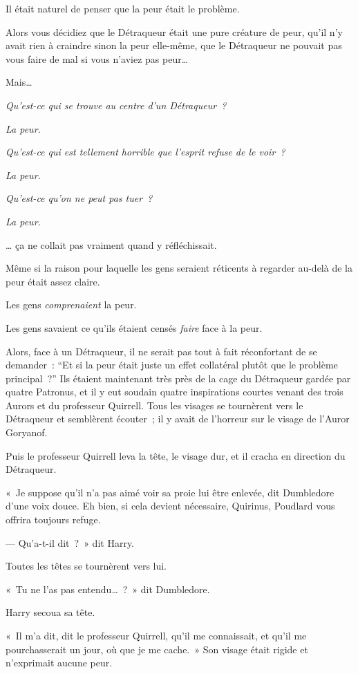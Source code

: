 Il était naturel de penser que la peur était le problème.

Alors vous décidiez que le Détraqueur était une pure créature de peur, qu'il n'y avait rien à craindre sinon la peur elle-même, que le Détraqueur ne pouvait pas vous faire de mal si vous n'aviez pas peur…

Mais…

\emph{Qu'est-ce qui se trouve au centre d'un Détraqueur~?}

\emph{La peur.}

\emph{Qu'est-ce qui est tellement horrible que l'esprit refuse de le voir~?}

\emph{La peur.}

\emph{Qu'est-ce qu'on ne peut pas tuer~?}

\emph{La peur.}

… ça ne collait pas vraiment quand y réfléchissait.

Même si la raison pour laquelle les gens seraient réticents à regarder au-delà de la peur était assez claire.

Les gens \emph{comprenaient} la peur.

Les gens savaient ce qu'ils étaient censés \emph{faire} face à la peur.

Alors, face à un Détraqueur, il ne serait pas tout à fait réconfortant de se demander~: “Et si la peur était juste un effet collatéral plutôt que le problème principal~?”
Ils étaient maintenant très près de la cage du Détraqueur gardée par quatre Patronus, et il y eut soudain quatre inspirations courtes venant des trois Aurors et du professeur Quirrell. Tous les visages se tournèrent vers le Détraqueur et semblèrent écouter~; il y avait de l'horreur sur le visage de l'Auror Goryanof.

Puis le professeur Quirrell leva la tête, le visage dur, et il cracha en direction du Détraqueur.

«~Je suppose qu'il n'a pas aimé voir sa proie lui être enlevée, dit Dumbledore d'une voix douce. Eh bien, si cela devient nécessaire, Quirinus, Poudlard vous offrira toujours refuge.

--- Qu'a-t-il dit~?~» dit Harry.

Toutes les têtes se tournèrent vers lui.

«~Tu ne l'as pas entendu…~?~» dit Dumbledore.

Harry secoua sa tête.

«~Il m'a dit, dit le professeur Quirrell, qu'il me connaissait, et qu'il me pourchasserait un jour, où que je me cache.~» Son visage était rigide et n'exprimait aucune peur.

